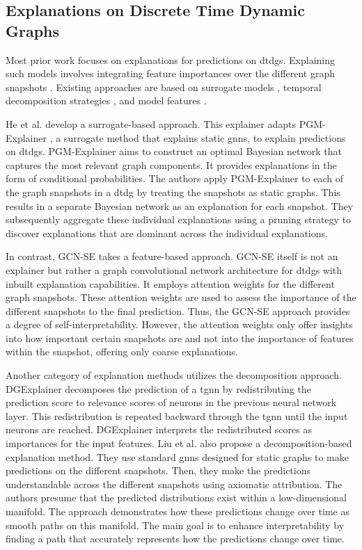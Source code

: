 \subsection{Explanations on Discrete Time Dynamic Graphs}
\label{s_relatedWork_DTDG}

Most prior work focuses on explanations for predictions on \glspl{dtdg}. Explaining such models involves integrating feature importances over the different graph snapshots \cite{he_explainer_2022}. Existing approaches are based on surrogate models \cite{he_explainer_2022}, temporal decomposition strategies \cite{xie_explaining_2022, liu_differential_2023}, and model features \cite{fan_gcn-se_2021}.


He et al. \cite{he_explainer_2022} develop a surrogate-based approach. This explainer adapts PGM-Explainer \cite{vu_pgm-explainer_2020}, a surrogate method that explains static \glspl{gnn}, to explain predictions on \glspl{dtdg}. PGM-Explainer aims to construct an optimal Bayesian network that captures the most relevant graph components. It provides explanations in the form of conditional probabilities. The authors apply PGM-Explainer to each of the graph snapshots in a \gls{dtdg} by treating the snapshots as static graphs. This results in a separate Bayesian network as an explanation for each snapshot. They subsequently aggregate these individual explanations using a pruning strategy to discover explanations that are dominant across the individual explanations.

In contrast, GCN-SE \cite{fan_gcn-se_2021} takes a feature-based approach. GCN-SE itself is not an explainer but rather a graph convolutional network architecture for \glspl{dtdg} with inbuilt explanation capabilities. It employs attention weights for the different graph snapshots. These attention weights are used to assess the importance of the different snapshots to the final prediction. Thus, the GCN-SE approach provides a degree of self-interpretability. However, the attention weights only offer insights into how important certain snapshots are and not into the importance of features within the snapshot, offering only coarse explanations.

Another category of explanation methods utilizes the decomposition approach. DGExplainer \cite{xie_explaining_2022} decomposes the prediction of a \gls{tgnn} by redistributing the prediction score to relevance scores of neurons in the previous neural network layer. This redistribution is repeated backward through the \gls{tgnn} until the input neurons are reached. DGExplainer interprets the redistributed scores as importances for the input features. Liu et al. \cite{liu_differential_2023} also propose a decomposition-based explanation method. They use standard \glspl{gnn} designed for static graphs to make predictions on the different snapshots. Then, they make the predictions understandable across the different snapshots using axiomatic attribution. The authors presume that the predicted distributions exist within a low-dimensional manifold. The approach demonstrates how these predictions change over time as smooth paths on this manifold. The main goal is to enhance interpretability by finding a path that accurately represents how the predictions change over time.


